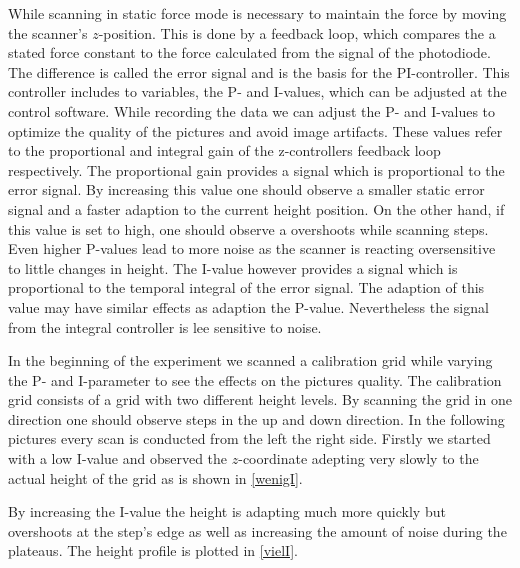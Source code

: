 \documentclass[paper=a4,fontsize=10pt,DIV=18,twocolumn,parskip=half]{scrartcl}
\numberwithin{equation}{section}    %
\begin{document}
While scanning in static force mode is necessary to maintain the force by moving 
the scanner's $z$-position. This is done by a feedback loop, which compares the 
a stated force constant to the force calculated from the signal of the 
photodiode. The difference is called the error signal and is the basis for the 
PI-controller. This controller includes to variables, the P- and I-values, which 
can be adjusted at the control software.
While recording the data we can adjust the P- and I-values to optimize the 
quality of the pictures and avoid image artifacts. These values refer to the 
proportional and integral gain of the z-controllers feedback loop respectively. 
The proportional gain provides a signal which is proportional to the error 
signal. By increasing this value one should observe a smaller static error 
signal and a faster adaption to the current height position.
On the other hand, if this value is set to high, one should observe a overshoots 
while scanning steps. Even higher P-values lead to more noise as the scanner is 
reacting oversensitive to little changes in height. The I-value however provides 
a signal which is proportional to the temporal integral of the error signal. The 
adaption of this value may have similar effects as adaption the P-value. 
Nevertheless the signal from the integral controller is lee sensitive to noise.

In the beginning of the experiment we scanned a calibration grid while varying 
the P- and I-parameter to see the effects on the pictures quality. The 
calibration grid consists of a grid with two different height levels. By 
scanning the grid in one direction one should observe steps in the up and down 
direction. In the following pictures every scan is conducted from the left the 
right side. Firstly we started with a low I-value and observed the 
$z$-coordinate adepting very slowly to the actual height of the grid as is shown 
in \ref{wenigI}.


By increasing the I-value the height is adapting much more quickly but 
overshoots at the step's edge as well as increasing the amount of noise during 
the plateaus. The height profile is plotted in \ref{vielI}.
\end{document}
